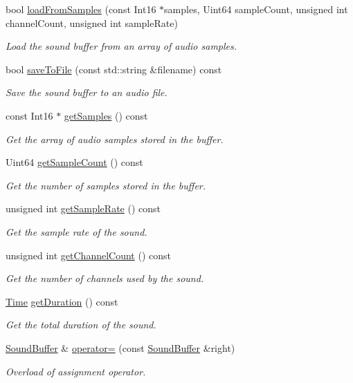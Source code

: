 \begin{DoxyCompactItemize}
bool \mbox{\hyperlink{classsf_1_1_sound_buffer_a42d51ce4bb3b60c7ea06f63c273fd063}{load\+From\+Samples}} (const Int16 $\ast$samples, Uint64 sample\+Count, unsigned int channel\+Count, unsigned int sample\+Rate)
\begin{DoxyCompactList}\small\item\em Load the sound buffer from an array of audio samples. \end{DoxyCompactList}\item 
bool \mbox{\hyperlink{classsf_1_1_sound_buffer_aade64260c6375580a085314a30be007e}{save\+To\+File}} (const std\+::string \&filename) const
\begin{DoxyCompactList}\small\item\em Save the sound buffer to an audio file. \end{DoxyCompactList}\item 
const Int16 $\ast$ \mbox{\hyperlink{classsf_1_1_sound_buffer_ab9b2525a8da64cb266ba728aff7adecb}{get\+Samples}} () const
\begin{DoxyCompactList}\small\item\em Get the array of audio samples stored in the buffer. \end{DoxyCompactList}\item 
Uint64 \mbox{\hyperlink{classsf_1_1_sound_buffer_aebe2a4bdbfbd9249353748da3f6a4fa1}{get\+Sample\+Count}} () const
\begin{DoxyCompactList}\small\item\em Get the number of samples stored in the buffer. \end{DoxyCompactList}\item 
unsigned int \mbox{\hyperlink{classsf_1_1_sound_buffer_a2c2cf0078ce0549246ecc4a1646212b4}{get\+Sample\+Rate}} () const
\begin{DoxyCompactList}\small\item\em Get the sample rate of the sound. \end{DoxyCompactList}\item 
unsigned int \mbox{\hyperlink{classsf_1_1_sound_buffer_a127707b831d875ed790eef1aa2b9fcc3}{get\+Channel\+Count}} () const
\begin{DoxyCompactList}\small\item\em Get the number of channels used by the sound. \end{DoxyCompactList}\item 
\mbox{\hyperlink{classsf_1_1_time}{Time}} \mbox{\hyperlink{classsf_1_1_sound_buffer_a280a581d9b360fd16121714c51fc8261}{get\+Duration}} () const
\begin{DoxyCompactList}\small\item\em Get the total duration of the sound. \end{DoxyCompactList}\item 
\mbox{\hyperlink{classsf_1_1_sound_buffer}{Sound\+Buffer}} \& \mbox{\hyperlink{classsf_1_1_sound_buffer_adcc786b60bbd95be1551368fafd274a7}{operator=}} (const \mbox{\hyperlink{classsf_1_1_sound_buffer}{Sound\+Buffer}} \&right)
\begin{DoxyCompactList}\small\item\em Overload of assignment operator. \end{DoxyCompactList}\end{DoxyCompactItemize}
